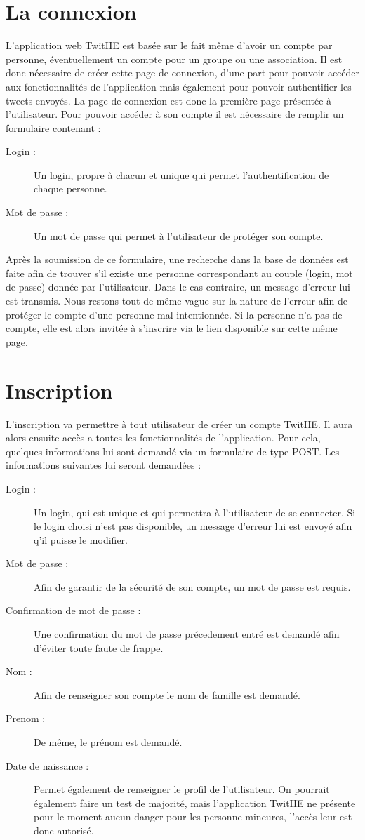 \documentclass[a4paper, 12pt]{article}
\begin{document}
\section{La connexion}	
L'application web TwitIIE est basée sur le fait même d'avoir un compte par personne, éventuellement un compte pour un groupe ou une association. Il est donc nécessaire de créer cette page de connexion, d'une part pour pouvoir accéder aux fonctionnalités de l'application mais également pour pouvoir authentifier les tweets envoyés.
La page de connexion est donc la première page présentée à l'utilisateur. Pour pouvoir accéder à son compte il est nécessaire de remplir un formulaire contenant : 
\begin{description}
\item[Login :] Un login, propre à chacun et unique qui permet l'authentification de chaque personne.
\item[Mot de passe :] Un mot de passe qui permet à l'utilisateur de protéger son compte.
\end{description}
Après la soumission de ce formulaire, une recherche dans la base de données est faite afin de trouver s'il existe une personne correspondant au couple (login, mot de passe) donnée par l'utilisateur.
Dans le cas contraire, un message d'erreur lui est transmis. Nous restons tout de même vague sur la nature de l'erreur afin de protéger le compte d'une personne mal intentionnée.
Si la personne n'a pas de compte, elle est alors invitée à s'inscrire via le lien disponible sur cette même page. 

\section{Inscription}
L'inscription va permettre à tout utilisateur de créer un compte TwitIIE. Il aura alors ensuite accès a toutes les fonctionnalités de l'application.
Pour cela, quelques informations lui sont demandé via un formulaire de type POST. Les informations suivantes lui seront demandées : 
\begin{description}
\item[Login :] Un login, qui est unique et qui permettra à l'utilisateur de se connecter. Si le login choisi n'est pas disponible, un message d'erreur lui est envoyé afin q'il puisse le modifier.
\item[Mot de passe :] Afin de garantir de la sécurité de son compte, un mot de passe est requis.
\item[Confirmation de mot de passe :] Une confirmation du mot de passe précedement entré est demandé afin d'éviter toute faute de frappe.
\item[Nom :] Afin de renseigner son compte le nom de famille est demandé.
\item[Prenom :] De même, le prénom est demandé.
\item[Date de naissance :] Permet également de renseigner le profil de l'utilisateur. On pourrait également faire un test de majorité, mais l'application TwitIIE ne présente pour le moment aucun danger pour les personne mineures, l'accès leur est donc autorisé.
\end{description}
\end{document}
